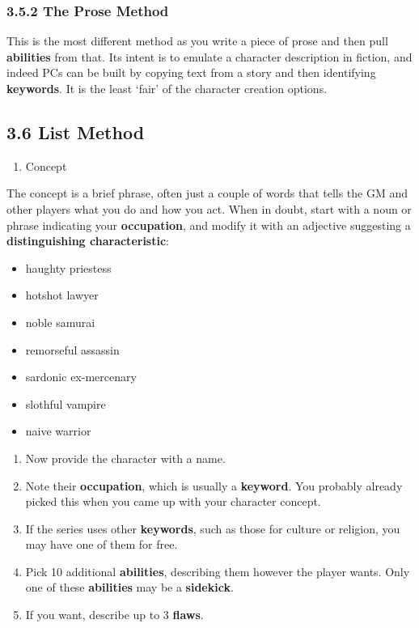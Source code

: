 \documentclass[
]{article}
\providecommand{\tightlist}{%
  \setlength{\itemsep}{0pt}\setlength{\parskip}{0pt}}
\begin{document}
\hypertarget{the-prose-method-1}{%
\subsubsection{3.5.2 The Prose Method}\label{the-prose-method-1}}

This is the most different method as you write a piece of prose and then
pull \textbf{abilities} from that. Its intent is to emulate a character
description in fiction, and indeed PCs can be built by copying text from
a story and then identifying \textbf{keywords}. It is the least `fair'
of the character creation options.

\hypertarget{list-method}{%
\subsection{3.6 List Method}\label{list-method}}

\begin{enumerate}
\def\labelenumi{\arabic{enumi}.}
\tightlist
\item
  Concept
\end{enumerate}

The concept is a brief phrase, often just a couple of words that tells
the GM and other players what you do and how you act. When in doubt,
start with a noun or phrase indicating your \textbf{occupation}, and
modify it with an adjective suggesting a \textbf{distinguishing
characteristic}:

\begin{itemize}
\tightlist
\item
  haughty priestess
\item
  hotshot lawyer
\item
  noble samurai
\item
  remorseful assassin
\item
  sardonic ex-mercenary
\item
  slothful vampire
\item
  naive warrior
\end{itemize}

\begin{enumerate}
\def\labelenumi{\arabic{enumi}.}
\setcounter{enumi}{1}
\tightlist
\item
  Now provide the character with a name.
\item
  Note their \textbf{occupation}, which is usually a \textbf{keyword}.
  You probably already picked this when you came up with your character
  concept.
\item
  If the series uses other \textbf{keywords}, such as those for culture
  or religion, you may have one of them for free.
\item
  Pick 10 additional \textbf{abilities}, describing them however the
  player wants. Only one of these \textbf{abilities} may be a
  \textbf{sidekick}.
\item
  If you want, describe up to 3 \textbf{flaws}.
\end{enumerate}
\end{document}
